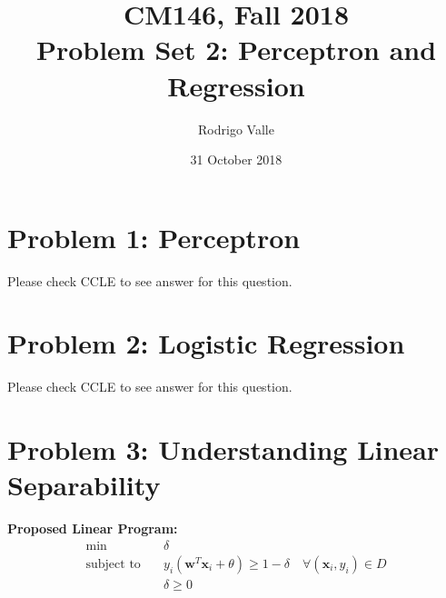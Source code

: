 \documentclass[11pt]{article}
\newcommand{\cnum}{CM146}
\newcommand{\ced}{Fall 2018}
\newcommand{\ctitle}[2]{\title{\vspace{-0.5in}\cnum, \ced\\Problem Set #1: #2}}
\newenvironment{solution}{\color{blue}{\bf Solution:}}{}
\begin{document}
\ctitle{2}{Perceptron and Regression}
\author{Rodrigo Valle}
\date{31 October 2018}
\maketitle

\section{Problem 1: Perceptron}
\begin{solution}
  Please check CCLE to see answer for this question.
\end{solution}

\section{Problem 2: Logistic Regression}
\begin{solution}
  Please check CCLE to see answer for this question.
\end{solution}

\newpage
\section{Problem 3: Understanding Linear Separability}
\textbf{Proposed Linear Program:}
\[
  \begin{split}
    \min             \quad& \delta\\
    \text{subject to}\quad& y_i(\mathbf{w}^T \mathbf{x}_i + \theta) \geq 1 - \delta \quad \forall(\mathbf{x}_i, y_i) \in D\\
                     \quad& \delta \geq 0
  \end{split}
\]
\end{document}
